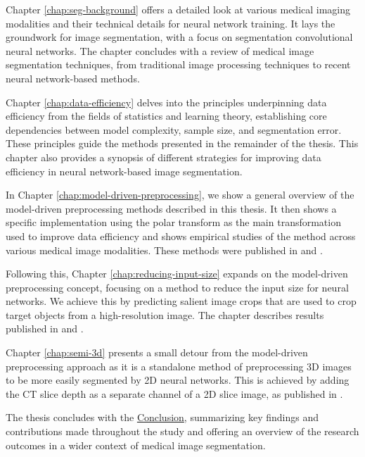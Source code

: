 Chapter \ref{chap:seg-background} offers a detailed look at various medical imaging modalities and their technical details for neural network training. It lays the groundwork for image segmentation, with a focus on segmentation convolutional neural networks. The chapter concludes with a review of medical image segmentation techniques, from traditional image processing techniques to recent neural network-based methods.

Chapter \ref{chap:data-efficiency} delves into the principles underpinning data efficiency from the fields of statistics and learning theory, establishing core dependencies between model complexity, sample size, and segmentation error. These principles guide the methods presented in the remainder of the thesis. This chapter also provides a synopsis of different strategies for improving data efficiency in neural network-based image segmentation.

In Chapter \ref{chap:model-driven-preprocessing}, we show a general overview of the model-driven preprocessing methods described in this thesis. It then shows a specific implementation using the polar transform as the main transformation used to improve data efficiency and shows empirical studies of the method across various medical image modalities. These methods were published in \cite{bencevicTrainingPolarImage2021} and \cite{bencevicUsingPolarTransform2022}.

Following this, Chapter \ref{chap:reducing-input-size} expands on the model-driven preprocessing concept, focusing on a method to reduce the input size for neural networks. We achieve this by predicting salient image crops that are used to crop target objects from a high-resolution image. The chapter describes results published in \cite{bencevicSegmentthenSegmentContextPreservingCropBased2023} and \cite{bencevicCropGuidedNeuralNetwork2024}.

Chapter \ref{chap:semi-3d} presents a small detour from the model-driven preprocessing approach as it is a standalone method of preprocessing 3D images to be more easily segmented by 2D neural networks. This is achieved by adding the CT slice depth as a separate channel of a 2D slice image, as published in \cite{bencevicEpicardialAdiposeTissue2021}.

The thesis concludes with the \hyperref[chap:conclusion]{Conclusion}, summarizing key findings and contributions made throughout the study and offering an overview of the research outcomes in a wider context of medical image segmentation.
